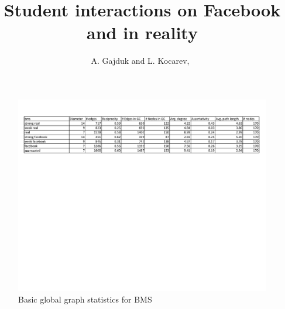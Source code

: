\documentclass[journal]{IEEEtran}
\begin{document}
\title{Student interactions on Facebook and in reality}



\author{A. Gajduk and
        L. Kocarev,~%

}

%
\maketitle
%

\begin{figure}[!htb]
\centering
\includegraphics[scale=.65]{bms_stats.pdf}
\caption{Basic global graph statistics for BMS}
\end{figure}
\end{document}
